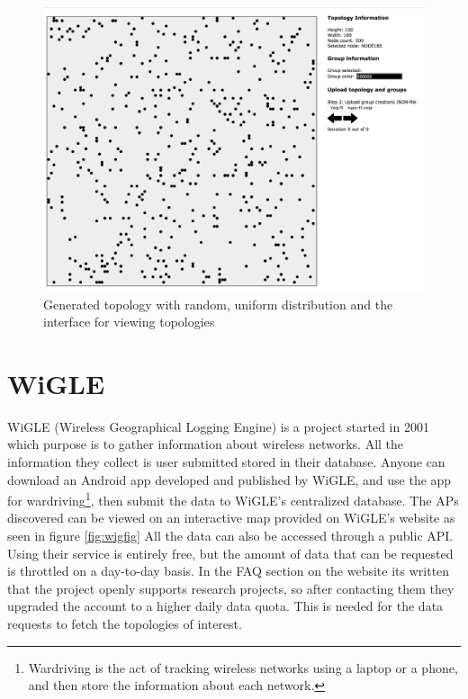 \begin{figure}[h]
\center
\includegraphics[scale=0.35]{Images/interface.png}
\caption{Generated topology with random, uniform distribution and the interface for viewing topologies}
\label{fig:randtop}
\end{figure}

\section{WiGLE}
WiGLE (Wireless Geographical Logging Engine) \cite{wigle} is a project started in 2001 which purpose is to gather information about wireless networks. All the information
they collect is user submitted stored in their database. Anyone can download an Android app developed and published by WiGLE, and use the app for wardriving\footnote{Wardriving is the act of tracking wireless networks using a laptop or a phone,	and then store the information about each network.},
	then submit the data to WiGLE's centralized database. The APs discovered can be viewed on an interactive map provided on WiGLE's website as seen in figure \ref{fig:wigfig} 
	All the data can also be accessed through a public API. Using their service is entirely free, but the
	amount of data that can be requested is throttled on a day-to-day basis. In the FAQ section on the website its written that the project openly supports research projects, 
	so after contacting them they upgraded the account to a higher daily data quota. This is needed for the data requests to fetch the topologies of interest. 


